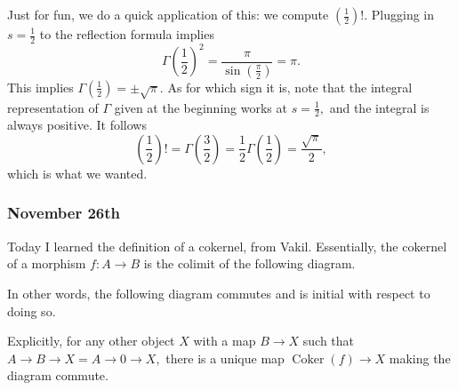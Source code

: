 Just for fun, we do a quick application of this: we compute $\left(\frac12\right)!.$ Plugging in $s=\frac12$ to the reflection formula implies
\[\Gamma\left(\frac12\right)^2=\frac\pi{\sin\left(\frac\pi2\right)}=\pi.\]
This implies $\Gamma\left(\frac12\right)=\pm\sqrt\pi.$ As for which sign it is, note that the integral representation of $\Gamma$ given at the beginning works at $s=\frac12,$ and the integral is always positive. It follows
\[\left(\frac12\right)!=\Gamma\left(\frac32\right)=\frac12\Gamma\left(\frac12\right)=\frac{\sqrt\pi}2,\]
which is what we wanted.

\subsubsection{November 26th}
Today I learned the definition of a cokernel, from Vakil. Essentially, the cokernel of a morphism $f:A\to B$ is the colimit of the following diagram.
\begin{center}
\end{center}
In other words, the following diagram commutes and is initial with respect to doing so.
\begin{center}
\end{center}
Explicitly, for any other object $X$ with a map $B\to X$ such that $A\to B\to X=A\to 0\to X,$ there is a unique map $\operatorname{Coker}(f)\to X$ making the diagram commute.
\begin{center}
\end{center}


